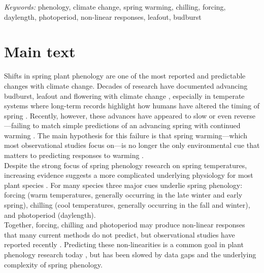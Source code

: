 \documentclass[11pt,letter]{article}
\begin{document}
\noindent \emph{Keywords:} phenology, climate change, spring warming, chilling, forcing, daylength, photoperiod, non-linear responses, leafout, budburst\\

\newpage
\linenumbers
\section{Main text} %
Shifts in spring plant phenology are one of the most reported and predictable changes with climate change. Decades of research have documented advancing budburst, leafout and flowering with climate change \citep{delpierre2009, yu2010,Ellwood2012,jochner2013,hereford2017}, especially in temperate systems where long-term records highlight how humans have altered the timing of spring \citep{Schwartz:1997nn,Menzel2003a,menzel2006}. Recently, however, these advances have appeared to slow \citep{fu2015} or even reverse \citep{yu2010}---failing to match simple predictions of an advancing spring with continued warming \citep{Ellwood2012}. The main hypothesis for this failure is that spring warming---which most observational studies focus on---is no longer the only environmental cue that matters to predicting responses to warming \citep{chuine2016,gauzere2019}.\\

Despite the strong focus of spring phenology research on spring temperatures, increasing evidence suggests a more complicated underlying physiology for most plant species \citep[e.g.,][]{zohner2016,gauzere2019,ettinger2020}. For many species three major cues underlie spring phenology: forcing (warm temperatures, generally occurring in the late winter and early spring), chilling (cool temperatures, generally occurring in the fall and winter), and photoperiod (daylength). \\

Together, forcing, chilling and photoperiod may produce non-linear responses that many current methods do not predict, but observational studies have reported recently \citep{fu2015}. Predicting these non-linearities is a common goal in plant phenology research today \citep{gusewell2017,martlusch2017,gauzere2019,chen2019,keenan2019}, but has been slowed by data gaps and the underlying complexity of spring phenology. \\
\end{document}
